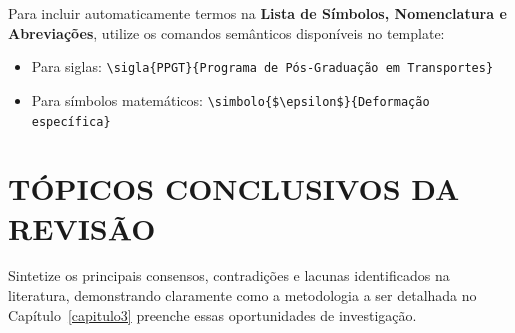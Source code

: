 Para incluir automaticamente termos na \textbf{Lista de Símbolos, Nomenclatura e Abreviações}, utilize os comandos semânticos disponíveis no template:
\begin{itemize}
  \item Para siglas: \texttt{\textbackslash sigla\{PPGT\}\{Programa de Pós-Graduação em Transportes\}}
  \item Para símbolos matemáticos: \texttt{\textbackslash simbolo\{\$\textbackslash epsilon\$\}\{Deformação específica\}}
\end{itemize}

\section{TÓPICOS CONCLUSIVOS DA REVISÃO}
\label{sec:conclusivos_revisao}

Sintetize os principais consensos, contradições e lacunas identificados na literatura, demonstrando claramente como a metodologia a ser detalhada no Capítulo~\ref{capitulo3} preenche essas oportunidades de investigação.
